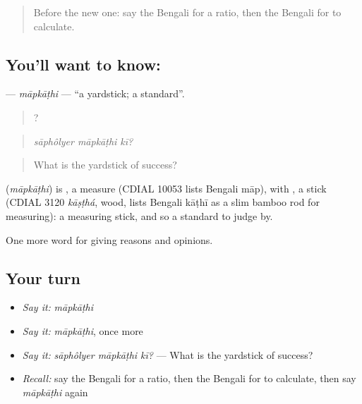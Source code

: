 \label{lesson:BN-C356-mapkathi}



\begin{quote}
Before the new one: say the Bengali for a ratio, then the Bengali for to calculate.
\end{quote}

\subsection*{You'll want to know: }
\textbf{} — \emph{māpkāṭhi} — \textquotedblleft{}a yardstick; a standard\textquotedblright{}.

\begin{quote}
  ?
\end{quote}

\begin{quote}
\emph{sāphôlyer māpkāṭhi kī?}
\end{quote}

\begin{quote}
What is the yardstick of success?
\end{quote}

\begin{cousinweb}
\textbf{} (\emph{māpkāṭhi}) is , a measure (CDIAL 10053 lists Bengali māp), with , a stick (CDIAL 3120 \emph{kāṣṭhá}, wood, lists Bengali kāṭhī as a slim bamboo rod for measuring): a measuring stick, and so a standard to judge by.
\end{cousinweb}

\begin{grammarlens}[title={What you've built}]
One more word for giving reasons and opinions.
\end{grammarlens}

\subsection*{Your turn}
\begin{itemize}
\raggedright
  \item \emph{Say it:} \emph{māpkāṭhi}
  \item \emph{Say it:} \emph{māpkāṭhi}, once more
  \item \emph{Say it:} \emph{sāphôlyer māpkāṭhi kī?} — What is the yardstick of success?
  \item \emph{Recall:} say the Bengali for a ratio, then the Bengali for to calculate, then say \emph{māpkāṭhi} again
\end{itemize}

